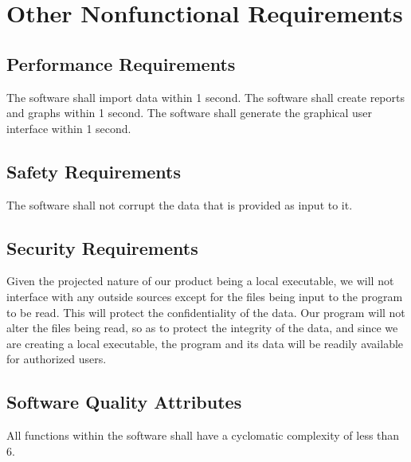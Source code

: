 \section{Other Nonfunctional Requirements}
%

\subsection{Performance Requirements}

The software shall import data within 1 second.
The software shall create reports and graphs within 1 second.
The software shall generate the graphical user interface within 1 second.

\subsection{Safety Requirements}

The software shall not corrupt the data that is provided as input to it.

\subsection{Security Requirements}
Given the projected nature of our product being a local executable, we will not interface with any outside sources except for the files being input to the program to be read. This will protect the confidentiality of the data. Our program will not alter the files being read, so as to protect the integrity of the data, and since we are creating a local executable, the program and its data will be readily available for authorized users.

\subsection{Software Quality Attributes}

All functions within the software shall have a cyclomatic complexity of less than 6.